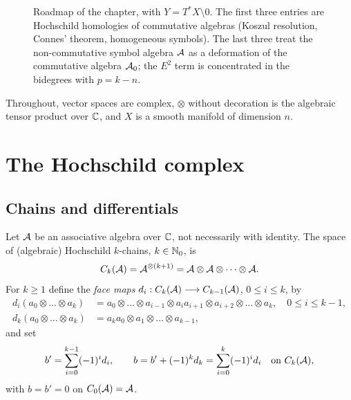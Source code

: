 \begin{figure}[htbp]
\centering
{}
\caption[Roadmap of the computation of Hochschild homology]{Roadmap of the
chapter, with $Y=T^*X\setminus0$. The first three entries are Hochschild
homologies of commutative algebras (Koszul resolution, Connes' theorem,
homogeneous symbols). The last three treat the non-commutative symbol algebra
$\mathcal{A}$ as a deformation of the commutative algebra $\mathcal{A}_0$; the $E^2$ term is
concentrated in the bidegrees with $p=k-n$.}
\label{hochschild:fig:roadmap}
\end{figure}

Throughout, vector spaces are complex, $\otimes$ without decoration is the
algebraic tensor product over $\mathbb{C}$, and $X$ is a smooth manifold of dimension
$n$.

\section{The Hochschild complex}\label{hochschild:sec:complex}

\subsection{Chains and differentials}
Let $\mathcal{A}$ be an associative algebra over $\mathbb{C}$, not necessarily with identity.
The space of (algebraic) Hochschild $k$-chains, $k\in\mathbb{N}_0$, is
\begin{equation*}
  C_k(\mathcal{A})=\mathcal{A}^{\otimes(k+1)}=\mathcal{A}\otimes\mathcal{A}\otimes\dots\otimes\mathcal{A} .
\end{equation*}
For $k\ge1$ define the \emph{face maps} $d_i:C_k(\mathcal{A})\longrightarrow C_{k-1}(\mathcal{A})$,
$0\le i\le k$, by
\begin{equation}
\begin{aligned}
  d_i(a_0\otimes\dots\otimes a_k)&=a_0\otimes\dots\otimes a_{i-1}\otimes
  a_ia_{i+1}\otimes a_{i+2}\otimes\dots\otimes a_k,\quad 0\le i\le k-1,\\
  d_k(a_0\otimes\dots\otimes a_k)&=a_ka_0\otimes a_1\otimes\dots\otimes a_{k-1},
\end{aligned}
\label{hochschild:eq:faces}
\end{equation}
and set
\begin{equation}
  b'=\sum_{i=0}^{k-1}(-1)^id_i,\qquad b=b'+(-1)^kd_k=\sum_{i=0}^k(-1)^id_i
  \quad\text{on }C_k(\mathcal{A}),
  \label{hochschild:eq:b}
\end{equation}
with $b=b'=0$ on $C_0(\mathcal{A})=\mathcal{A}$.

